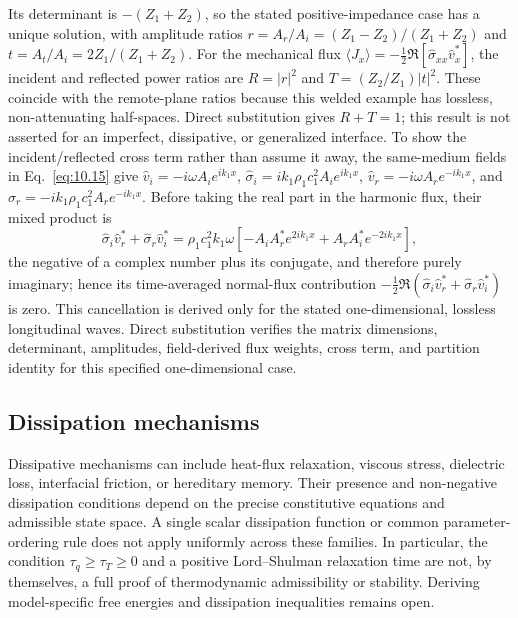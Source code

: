 Its determinant is $-(Z_1+Z_2)$, so the stated positive-impedance case has a unique solution, with amplitude ratios $r=A_r/A_i=(Z_1-Z_2)/(Z_1+Z_2)$ and $t=A_t/A_i=2Z_1/(Z_1+Z_2)$. For the mechanical flux $\langle J_x\rangle=-\tfrac12\Re[\hat\sigma_{xx}\hat v_x^*]$, the incident and reflected power ratios are $R=|r|^2$ and $T=(Z_2/Z_1)|t|^2$. These coincide with the remote-plane ratios because this welded example has lossless, non-attenuating half-spaces. Direct substitution gives $R+T=1$; this result is not asserted for an imperfect, dissipative, or generalized interface. To show the incident/reflected cross term rather than assume it away, the same-medium fields in Eq.~\eqref{eq:10.15} give $\hat v_i=-i\omega A_i e^{ik_1x}$, $\hat\sigma_i=ik_1\rho_1c_1^2 A_i e^{ik_1x}$, $\hat v_r=-i\omega A_r e^{-ik_1x}$, and $\hat\sigma_r=-ik_1\rho_1c_1^2 A_r e^{-ik_1x}$. Before taking the real part in the harmonic flux, their mixed product is
\begin{equation*}
\hat\sigma_i\hat v_r^*+\hat\sigma_r\hat v_i^*=\rho_1c_1^2 k_1\omega\left[-A_iA_r^*e^{2ik_1x}+A_rA_i^*e^{-2ik_1x}\right],
\end{equation*}
the negative of a complex number plus its conjugate, and therefore purely imaginary; hence its time-averaged normal-flux contribution $-\tfrac12\Re(\hat\sigma_i\hat v_r^*+\hat\sigma_r\hat v_i^*)$ is zero. This cancellation is derived only for the stated one-dimensional, lossless longitudinal waves. Direct substitution verifies the matrix dimensions, determinant, amplitudes, field-derived flux weights, cross term, and partition identity for this specified one-dimensional case.

\subsection{Dissipation mechanisms}
\label{sec:10.6}

Dissipative mechanisms can include heat-flux relaxation, viscous stress, dielectric loss, interfacial friction, or hereditary memory. Their presence and non-negative dissipation conditions depend on the precise constitutive equations and admissible state space. A single scalar dissipation function or common parameter-ordering rule does not apply uniformly across these families. In particular, the condition $\tau_q\geq\tau_T\geq0$ and a positive Lord--Shulman relaxation time are not, by themselves, a full proof of thermodynamic admissibility or stability. Deriving model-specific free energies and dissipation inequalities remains open.

